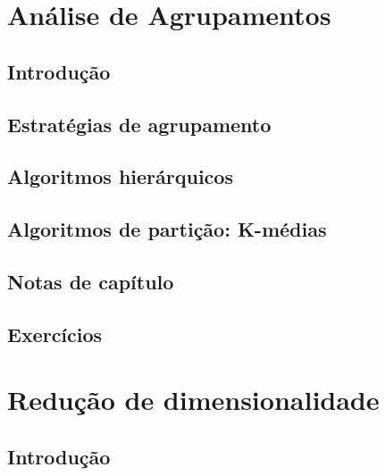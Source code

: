 \documentclass[
]{latex/krantz}
\theoremstyle{definition}
\theoremstyle{definition}
\theoremstyle{definition}
\theoremstyle{definition}
\theoremstyle{remark}
\begin{document}
\hypertarget{anuxe1lise-de-agrupamentos}{%
\chapter{Análise de Agrupamentos}\label{anuxe1lise-de-agrupamentos}}

\hypertarget{introduuxe7uxe3o-11}{%
\section{Introdução}\label{introduuxe7uxe3o-11}}

\hypertarget{estratuxe9gias-de-agrupamento}{%
\section{Estratégias de agrupamento}\label{estratuxe9gias-de-agrupamento}}

\hypertarget{algoritmos-hieruxe1rquicos}{%
\section{Algoritmos hierárquicos}\label{algoritmos-hieruxe1rquicos}}

\hypertarget{algoritmos-de-partiuxe7uxe3o-k-muxe9dias}{%
\section{Algoritmos de partição: K-médias}\label{algoritmos-de-partiuxe7uxe3o-k-muxe9dias}}

\hypertarget{notas-de-capuxedtulo-11}{%
\section{Notas de capítulo}\label{notas-de-capuxedtulo-11}}

\hypertarget{exercuxedcios-11}{%
\section{Exercícios}\label{exercuxedcios-11}}

\hypertarget{reduuxe7uxe3o-de-dimensionalidade}{%
\chapter{Redução de dimensionalidade}\label{reduuxe7uxe3o-de-dimensionalidade}}

\hypertarget{introduuxe7uxe3o-12}{%
\section{Introdução}\label{introduuxe7uxe3o-12}}
\end{document}

